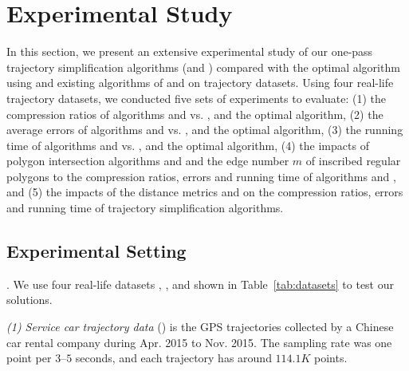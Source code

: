 \section{Experimental Study} %
\label{sec-exp}


In this section, we present an extensive experimental study of our one-pass trajectory simplification algorithms (\cist and \cista) compared with the optimal algorithm using \sed and existing algorithms of \dps and \squishe on trajectory datasets.
%
Using four real-life trajectory datasets, we conducted five sets of experiments to evaluate:
(1) the compression ratios of algorithms \cist and \cista vs. \dps, \squishe and the optimal algorithm,
(2) the average errors of algorithms \cist and \cista vs. \dps, \squishe and the optimal algorithm,
(3) the running time of algorithms \cist and \cista vs. \dps, \squishe and the optimal algorithm,
(4) the impacts of polygon intersection algorithms \rpia and \cpia and the edge number $m$ of inscribed regular polygons to the compression ratios, errors and running time of algorithms \cist and \cista, and
(5) the impacts of the distance metrics \ped and \sed on the compression ratios, errors and running time of trajectory simplification algorithms.



\subsection{Experimental Setting}

.
We use four real-life datasets \sercar, \geolife, \mopsi and \pricar shown in Table~\ref{tab:datasets} to test our solutions.


\vspace{0.5ex}
\ni \emph{(1) Service car trajectory data} (\sercar) is the GPS trajectories collected by a Chinese car rental company during Apr. 2015 to Nov. 2015. The sampling rate was one point per $3$--$5$ seconds, and
each trajectory has around $114.1K$ points.

